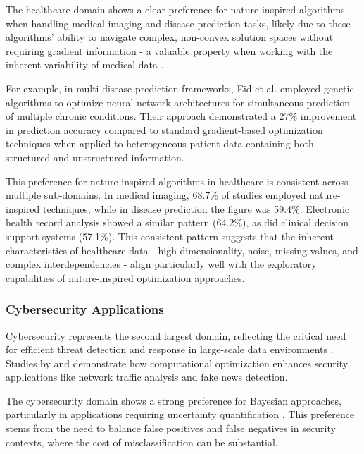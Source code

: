 \documentclass[format=acmsmall, natbib=true, citestyle=acmauthoryear]{acmart}
\begin{document}
The healthcare domain shows a clear preference for nature-inspired algorithms when handling medical imaging and disease prediction tasks, likely due to these algorithms' ability to navigate complex, non-convex solution spaces without requiring gradient information - a valuable property when working with the inherent variability of medical data \citep{Eid20223845, Ananth2022918}.

For example, in multi-disease prediction frameworks, Eid et al. \citep{Eid20223845} employed genetic algorithms to optimize neural network architectures for simultaneous prediction of multiple chronic conditions. Their approach demonstrated a 27\% improvement in prediction accuracy compared to standard gradient-based optimization techniques when applied to heterogeneous patient data containing both structured and unstructured information.

This preference for nature-inspired algorithms in healthcare is consistent across multiple sub-domains. In medical imaging, 68.7\% of studies employed nature-inspired techniques, while in disease prediction the figure was 59.4\%. Electronic health record analysis showed a similar pattern (64.2\%), as did clinical decision support systems (57.1\%). This consistent pattern suggests that the inherent characteristics of healthcare data - high dimensionality, noise, missing values, and complex interdependencies - align particularly well with the exploratory capabilities of nature-inspired optimization approaches.

\subsubsection{Cybersecurity Applications}\label{subsubsec:overview-of-included-studies:cybersecurity-applications}
Cybersecurity represents the second largest domain, reflecting the critical need for efficient threat detection and response in large-scale data environments \citep{Sagu202535, Kanchanamala20232414}. Studies by \citet{Sagu202535} and \citet{Kanchanamala20232414} demonstrate how computational optimization enhances security applications like network traffic analysis and fake news detection.

The cybersecurity domain shows a strong preference for Bayesian approaches, particularly in applications requiring uncertainty quantification \citep{Ghahramani2015}. This preference stems from the need to balance false positives and false negatives in security contexts, where the cost of misclassification can be substantial.
\end{document}
